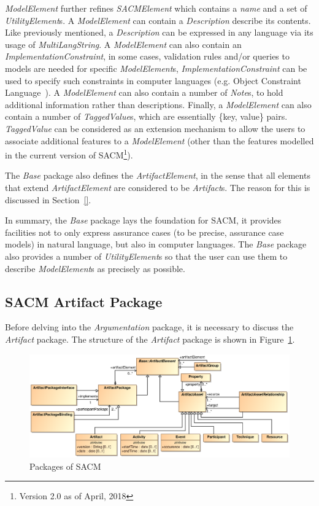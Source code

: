 \textit{ModelElement} further refines \textit{SACMElement} which contains a \textit{name} and a set of \textit{UtilityElement}s. A \textit{ModelElement} can contain a \textit{Description} describe its contents. Like previously mentioned, a \textit{Description} can be expressed in any language via its usage of \textit{MultiLangString}. A \textit{ModelElement} can also contain an \textit{ImplementationConstraint}, in some cases, validation rules and/or queries to models are needed for specific \textit{ModelElement}s, \textit{ImplementationConstraint} can be used to specify such constraints in computer languages (e.g. Object Constraint Language~\cite{}). A \textit{ModelElement} can also contain a number of \textit{Note}s, to hold additional information rather than descriptions. Finally, a \textit{ModelElement} can also contain a number of \textit{TaggedValue}s, which are essentially \{key, value\} pairs. \textit{TaggedValue} can be considered as an extension mechanism to allow the users to associate additional features to a \textit{ModelElement} (other than the features modelled in the current version of SACM\footnote{Version 2.0 as of April, 2018}).

The \textit{Base} package also defines the \textit{ArtifactElement}, in the sense that all elements that extend \textit{ArtifactElement} are considered to be \textit{Artifact}s. The reason for this is discussed in Section~\ref{}. 

In summary, the \textit{Base} package lays the foundation for SACM, it provides facilities not to only express assurance cases (to be precise, assurance case models) in natural language, but also in computer languages. The \textit{Base} package also provides a number of \textit{UtilityElement}s so that the user can use them to describe \textit{ModelElement}s as precisely as possible.

\subsection{SACM Artifact Package}
\label{sec:artiPack}
Before delving into the \textit{Argumentation} package, it is necessary to discuss the \textit{Artifact} package. The structure of the \textit{Artifact} package is shown in Figure~\ref{fig:arti}. 
\begin{figure}
	\centering
	\includegraphics[width=1\linewidth]{fig/Artifact.eps}
	\caption{Packages of SACM}
	\label{fig:arti}
\end{figure}

